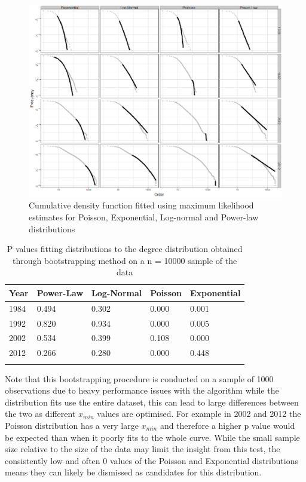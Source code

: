 \begin{figure}
\centering
  \includegraphics[width=\linewidth]{Figures/distributionFits}
  \caption[]{Cumulative density function fitted using maximum likelihood estimates for Poisson, Exponential, Log-normal and Power-law distributions}
\label{fig:distributionFits}
\end{figure}

\begin{table}
\caption{P values fitting distributions to the degree distribution obtained through bootstrapping method on a n = 10000 sample of the data}
\label{tab:distributionsP}
\centering
\begin{tabular}{l l l l l}
\toprule
Year & Power-Law & Log-Normal & Poisson & Exponential \\
\midrule
1984 & 0.494 & 0.302 & 0.000 & 0.001 \\
1992 & 0.820 & 0.934 & 0.000 & 0.005 \\
2002 & 0.534 & 0.399 & 0.108 & 0.000 \\
2012 & 0.266 & 0.280 & 0.000 & 0.448 \\
\bottomrule\\
\end{tabular}
\end{table}

Note that this bootstrapping procedure is conducted on a sample of 1000 observations due to heavy performance issues with the algorithm while the distribution fits use the entire dataset, this can lead to large differences between the two as different $x_{min}$ values are optimised. For example in 2002 and 2012 the Poisson distribution has a very large $x_{min}$ and therefore a higher p value would be expected than when it poorly fits to the whole curve. While the small sample size relative to the size of the data may limit the insight from this test, the consistently low and often 0 values of the Poisson and Exponential distributions means they can likely be dismissed as candidates for this distribution. 

